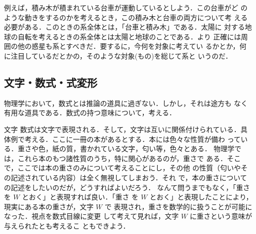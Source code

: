             例えば，積み木が積まれている台車が運動しているとしよう．この台車がど
            のような動きをするのかを考えるとき，この積み木と台車の両方について考
            える必要がある．このときの系全体とは，「台車と積み木」である．太陽に
            対する地球の自転を考えるときの系全体とは太陽と地球のことである．より
            正確には周囲の他の惑星も系とすべきだ．要するに，今何を対象に考えてい
            るかとか，何に注目しているだとかの，そのような対象(もの)を総じて系と
            いうのだ．

        \subsection{文字・数式・式変形}
            \begin{mycomment}
            物理学において，数式とは推論の道具に過ぎない．しかし，それは途方も
            なく有用な道具である．数式の持つ意味について，考える．
            \end{mycomment}

        \begin{mysmallsec}{文字}
            数式は文字で表現される．そして，文字は互いに関係付けられている．具
            体例で考える．ここに一冊の本があるとする．本には色々な性質が備わ
            っている．重さや色，紙の質，書かれている文字，匂い等，色々とある．
            物理学では，これら本のもつ諸性質のうち，特に関心があるのが，重さで
            ある．そこで，ここでは本の重さのみについて考えることにし，その他
            の性質（匂いやその記述されている内容）は全く無視してしまおう．それ
            で，本の重さについての記述をしたいのだが，どうすればよいだろう．
            なんて問うまでもなく，「重さを $W$ とおく」と表現すれば良い．「重さ
            を $W$ とおく」と表現したことにより，現実にある本の重さが，文字 $W$ で
            表現され，重さを数学的に扱うことが可能になった．視点を数式目線に変更
            して考えて見れば，文字 $W$ に重さという意味が与えられたとも考えるこ
            ともできよう．
        \end{mysmallsec}


